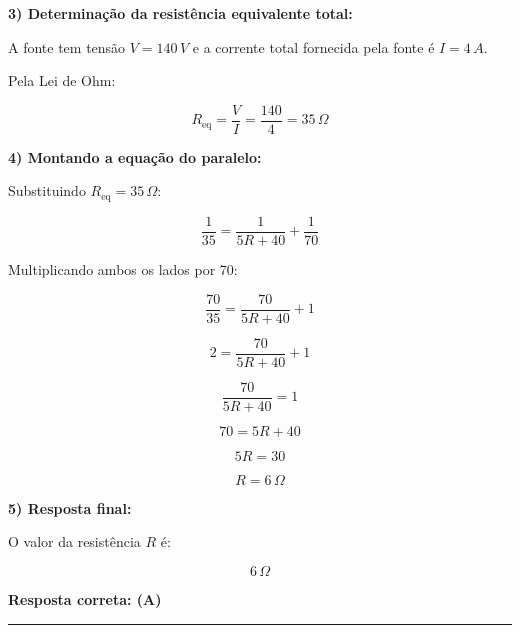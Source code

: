 \documentclass[a4paper,12pt]{article}
\begin{document}
\begin{flushleft}
\bigskip

\textbf{3) Determinação da resistência equivalente total:}

A fonte tem tensão \( V = 140 \, V \) e a corrente total fornecida pela fonte é \( I = 4 \, A \).

Pela Lei de Ohm:

\[
R_{\text{eq}} = \frac{V}{I} = \frac{140}{4} = 35 \, \Omega
\]

\bigskip

\textbf{4) Montando a equação do paralelo:}

Substituindo \( R_{\text{eq}} = 35 \, \Omega \):

\[
\frac{1}{35} = \frac{1}{5R + 40} + \frac{1}{70}
\]

Multiplicando ambos os lados por 70:

\[
\frac{70}{35} = \frac{70}{5R + 40} + 1
\]

\[
2 = \frac{70}{5R + 40} + 1
\]

\[
\frac{70}{5R + 40} = 1
\]

\[
70 = 5R + 40
\]

\[
5R = 30
\]

\[
R = 6 \, \Omega
\]

\bigskip

\textbf{5) Resposta final:}

O valor da resistência \( R \) é:

\[
\boxed{6 \, \Omega}
\]

\textbf{Resposta correta: \colorbox{green!50}{(A)}}

\end{flushleft}
\noindent\rule{\linewidth}{0.6pt}\\
\end{document}
